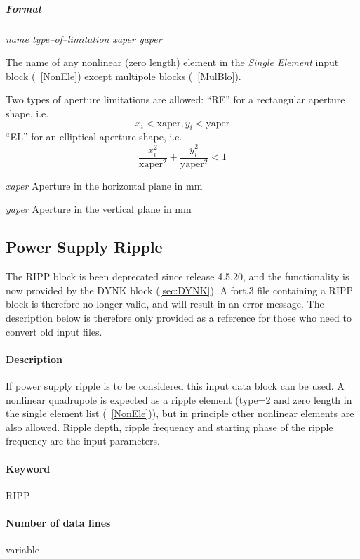 \documentclass[a4paper,11pt]{report}
\begin{document}
\subparagraph{Format} {\em name type--of--limitation xaper yaper}

\begin{description}
\item [name] The name of any nonlinear (zero length) element in the
  {\em Single Element} \/input block (~\ref{NonEle}) except multipole
  blocks (~\ref{MulBlo}).
\item [type--of--limitation] Two types of aperture limitations are
  allowed: \newline ``RE'' for a rectangular aperture shape, i.e.\ 
  $$
  x_{i} < \mathrm{xaper}, y_{i} < \mathrm{yaper}
  $$
  ``EL'' for an elliptical aperture shape, i.e.\ 
  $$
  \frac{x_{i}^{2}}{\mathrm{xaper}^{2}} + \frac{y_{i}^{2}}
  {\mathrm{yaper}^{2}} < 1
  $$
\item {\em xaper} \/Aperture in the horizontal plane in mm
\item {\em yaper} \/Aperture in the vertical plane in mm
\end{description}

\subsection{Power Supply Ripple} \label{PowRip}

The RIPP block is been deprecated since release 4.5.20, and the functionality is now provided by the DYNK block (\ref{sec:DYNK}).
A fort.3 file containing a RIPP block is therefore no longer valid, and will result in an error message.
The description below is therefore only provided as a reference for those who need to convert old input files.

\paragraph{Description} If power supply ripple is to be considered
this input data block can be used. A nonlinear quadrupole is expected
as a ripple element (type=2 and zero length in the single element list
(~\ref{NonEle})), but in principle other nonlinear elements are also
allowed.  Ripple depth, ripple frequency and starting phase of the
ripple frequency are the input parameters.

\paragraph{Keyword} RIPP

\paragraph{Number of data lines} variable
\end{document}
